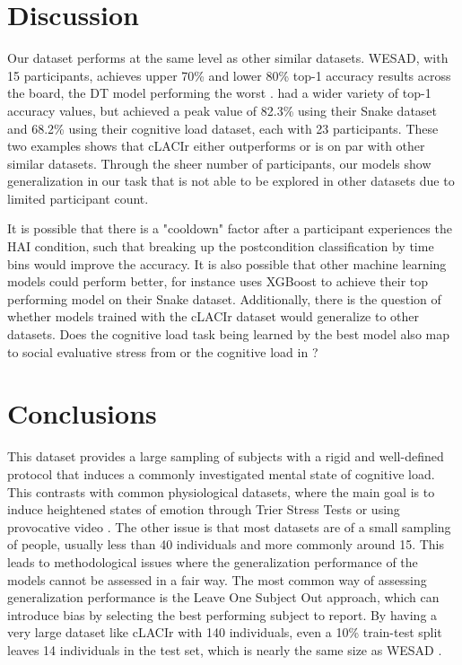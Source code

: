 \documentclass[12pt]{iopart}
\begin{document}
\section*{Discussion}

Our dataset performs at the same level as other similar datasets.  WESAD, with 15 participants, achieves upper 70\% and lower 80\% top-1 accuracy results across the board, the DT model performing the worst \cite{schmidt2018introducing}.  \cite{gjoreski2020datasets} had a wider variety of top-1 accuracy values, but achieved a peak value of 82.3\% using their Snake dataset and 68.2\% using their cognitive load dataset, each with 23 participants.  These two examples shows that cLACIr either outperforms or is on par with other similar datasets.  Through the sheer number of participants, our models show generalization in our task that is not able to be explored in other datasets due to limited participant count.  

It is possible that there is a "cooldown" factor after a participant experiences the HAI condition, such that breaking up the postcondition classification by time bins would improve the accuracy.  It is also possible that other machine learning models could perform better, for instance \cite{gjoreski2020datasets} uses XGBoost to achieve their top performing model on their Snake dataset.  Additionally, there is the question of whether models trained with the cLACIr dataset would generalize to other datasets.  Does the cognitive load task being learned by the best model also map to social evaluative stress from \cite{schmidt2018introducing} or the cognitive load in \cite{gjoreski2020datasets}?

\section*{Conclusions}

This dataset provides a large sampling of subjects with a rigid and well-defined protocol that induces a commonly investigated mental state of cognitive load.  This contrasts with common physiological datasets, where the main goal is to induce heightened states of emotion through Trier Stress Tests \cite{schmidt2018introducing} or using provocative video \cite{sharma2019dataset}.  The other issue is that most datasets are of a small sampling of people, usually less than 40 individuals and more commonly around 15.  This leads to methodological issues where the generalization performance of the models cannot be assessed in a fair way.  The most common way of assessing generalization performance is the Leave One Subject Out approach, which can introduce bias by selecting the best performing subject to report.  By having a very large dataset like cLACIr with 140 individuals, even a 10\% train-test split leaves 14 individuals in the test set, which is nearly the same size as WESAD \cite{schmidt2018introducing}.  
\end{document}
